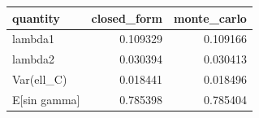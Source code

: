 \begin{tabular}{lrr}
\toprule
quantity & closed_form & monte_carlo \\
\midrule
lambda1 & 0.109329 & 0.109166 \\
lambda2 & 0.030394 & 0.030413 \\
Var(ell_C) & 0.018441 & 0.018496 \\
E[sin gamma] & 0.785398 & 0.785404 \\
\bottomrule
\end{tabular}
